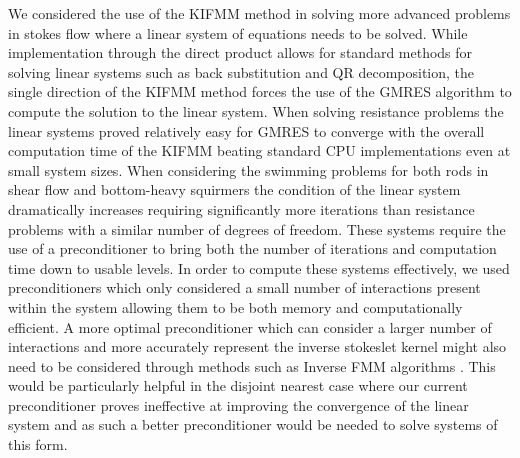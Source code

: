 We considered the use of the KIFMM method in solving more advanced problems in stokes flow where a linear system of equations needs to be solved. While implementation through the direct product allows for standard methods for solving linear systems such as back substitution and QR decomposition, the single direction of the KIFMM method forces the use of the GMRES algorithm to compute the solution to the linear system. When solving resistance problems the linear systems proved relatively easy for GMRES to converge with the overall computation time of the KIFMM beating standard CPU implementations even at small system sizes. When considering the swimming problems for both rods in shear flow and bottom-heavy squirmers the condition of the linear system dramatically increases requiring significantly more iterations than resistance problems with a similar number of degrees of freedom. These systems require the use of a preconditioner to bring both the number of iterations and computation time down to usable levels. In order to compute these systems effectively, we used preconditioners which only considered a small number of interactions present within the system allowing them to be both memory and computationally efficient. A more optimal preconditioner which can consider a larger number of interactions and more accurately represent the inverse stokeslet kernel might also need to be considered through methods such as Inverse FMM algorithms \cite{Ambikasaran2014TheMethod,Coulier2017TheSystems,Alleon1997SparseElectromagnetics}. This would be particularly helpful in the disjoint nearest case where our current preconditioner proves ineffective at improving the convergence of the linear system and as such a better preconditioner would be needed to solve systems of this form. 

